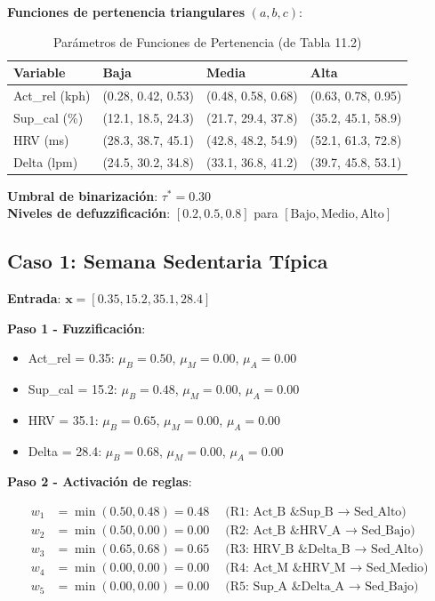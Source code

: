 \documentclass[12pt,letterpaper,twoside]{report}
\newcommand{\vect}[1]{\boldsymbol{#1}}
\begin{document}
\textbf{Funciones de pertenencia triangulares} $(a, b, c)$:

\begin{table}[H]
\centering
\caption{Parámetros de Funciones de Pertenencia (de Tabla 11.2)}
\label{tab:mf_params_anexo}
\footnotesize
\begin{tabular}{@{}llll@{}}
\toprule
\textbf{Variable} & \textbf{Baja} & \textbf{Media} & \textbf{Alta} \\
\midrule
Act\_rel (kph) & (0.28, 0.42, 0.53) & (0.48, 0.58, 0.68) & (0.63, 0.78, 0.95) \\
Sup\_cal (\%)  & (12.1, 18.5, 24.3) & (21.7, 29.4, 37.8) & (35.2, 45.1, 58.9) \\
HRV (ms)       & (28.3, 38.7, 45.1) & (42.8, 48.2, 54.9) & (52.1, 61.3, 72.8) \\
Delta (lpm)    & (24.5, 30.2, 34.8) & (33.1, 36.8, 41.2) & (39.7, 45.8, 53.1) \\
\bottomrule
\end{tabular}
\end{table}

\textbf{Umbral de binarización}: $\tau^* = 0.30$ \\
\textbf{Niveles de defuzzificación}: $[0.2, 0.5, 0.8]$ para $[\text{Bajo}, \text{Medio}, \text{Alto}]$

\subsection{Caso 1: Semana Sedentaria Típica}

\textbf{Entrada}: $\vect{x} = [0.35, 15.2, 35.1, 28.4]$

\textbf{Paso 1 - Fuzzificación}:

\begin{itemize}[noitemsep]
\item Act\_rel = 0.35: $\mu_B = 0.50$, $\mu_M = 0.00$, $\mu_A = 0.00$
\item Sup\_cal = 15.2: $\mu_B = 0.48$, $\mu_M = 0.00$, $\mu_A = 0.00$
\item HRV = 35.1: $\mu_B = 0.65$, $\mu_M = 0.00$, $\mu_A = 0.00$
\item Delta = 28.4: $\mu_B = 0.68$, $\mu_M = 0.00$, $\mu_A = 0.00$
\end{itemize}

\textbf{Paso 2 - Activación de reglas}:

\begin{align*}
w_1 &= \min(0.50, 0.48) = 0.48 \quad \text{(R1: Act\_B \& Sup\_B $\to$ Sed\_Alto)} \\
w_2 &= \min(0.50, 0.00) = 0.00 \quad \text{(R2: Act\_B \& HRV\_A $\to$ Sed\_Bajo)} \\
w_3 &= \min(0.65, 0.68) = 0.65 \quad \text{(R3: HRV\_B \& Delta\_B $\to$ Sed\_Alto)} \\
w_4 &= \min(0.00, 0.00) = 0.00 \quad \text{(R4: Act\_M \& HRV\_M $\to$ Sed\_Medio)} \\
w_5 &= \min(0.00, 0.00) = 0.00 \quad \text{(R5: Sup\_A \& Delta\_A $\to$ Sed\_Bajo)}
\end{align*}
\end{document}
